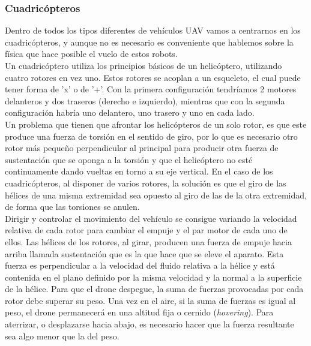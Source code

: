 \subsubsection{Cuadricópteros}\label{sec:quadrotors}

Dentro de todos los tipos diferentes de vehículos UAV vamos a centrarnos en los cuadricópteros, y aunque no es necesario es conveniente que hablemos sobre la física que hace posible el vuelo de estos robots.\\

Un cuadricóptero utiliza los principios básicos de un helicóptero, utilizando cuatro rotores en vez uno. Estos rotores se acoplan a un esqueleto, el cual puede tener forma de 'x' o de '+'. Con la primera configuración tendríamos 2 motores delanteros y dos traseros (derecho e izquierdo), mientras que con la segunda configuración habría uno delantero, uno trasero y uno en cada lado. \\

Un problema que tienen que afrontar los helicópteros de un solo rotor, es que este produce una fuerza de torsión en el sentido de giro, por lo que es necesario otro rotor más pequeño perpendicular al principal para producir otra fuerza de sustentación que se oponga a la torsión y que el helicóptero no esté continuamente dando vueltas en torno a su eje vertical. En el caso de los cuadricópteros, al disponer de varios rotores, la solución es que el giro de las hélices de una misma extremidad sea opuesto al giro de las de la otra extremidad, de forma que las torsiones se anulen.\\

Dirigir y controlar el movimiento del vehículo se consigue variando la velocidad relativa de cada rotor para cambiar el empuje y el par motor de cada uno de ellos. Las hélices de los rotores, al girar, producen una fuerza de empuje hacia arriba llamada sustentación que es la que hace que se eleve el aparato. Esta fuerza es perpendicular a la velocidad del fluido relativa a la hélice y está contenida en el plano definido por la misma velocidad y la normal a la superficie de la hélice. Para que el drone despegue, la suma de fuerzas provocadas por cada rotor debe superar su peso. Una vez en el aire, si la suma de fuerzas es igual al peso, el drone permanecerá en una altitud fija o cernido (\emph{hovering}). Para aterrizar, o desplazarse hacia abajo, es necesario hacer que la fuerza resultante sea algo menor que la del peso.\\


